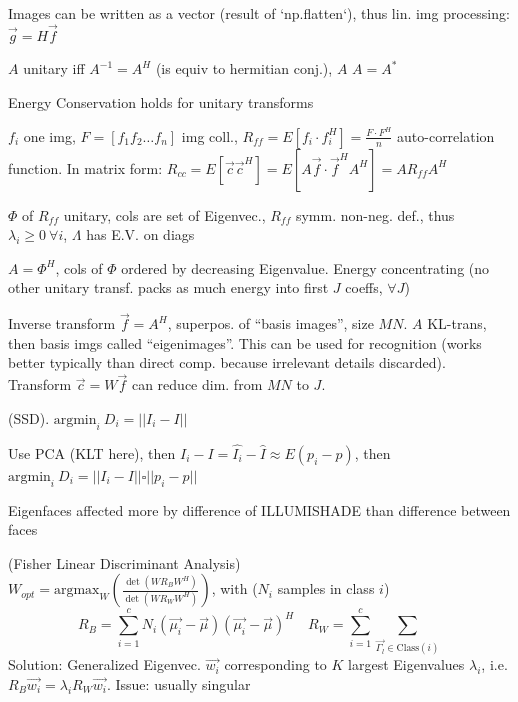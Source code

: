 Images can be written as a vector (result of `np.flatten`), thus lin. img processing: $\vec{g} = H \vec{f}$

 $A$ unitary iff $A^{-1} = A^{H}$ (is equiv to hermitian conj.), $A$  $A = A^*$

\shorttheorem Energy Conservation holds for unitary transforms

 $f_i$ one img, $F = [f_1 f_2 \dots f_n]$ img coll., $R_{ff} = E[f_i \cdot f_i^H] = \frac{F \cdot F^H}{n}$ auto-correlation function.
In matrix form: $R_{cc} = E[\vec{c} \vec{c}^H] = E[A\vec{f} \cdot \vec{f}^H A^H] = AR_{ff} A^H$

\shortdefinition[Eigenmatrix] $\Phi$ of $R_{ff}$ unitary, cols are set of Eigenvec., $R_{ff}$ symm. non-neg. def., thus $\lambda_i \geq 0 \ \forall i$,
$\Lambda$ has E.V. on diags

 $A = \Phi^H$, cols of $\Phi$ ordered by decreasing Eigenvalue.
Energy concentrating (no other unitary transf. packs as much energy into first $J$ coeffs, $\forall J$)

\shortremark Inverse transform $\vec{f} = A^H$, superpos. of ``basis images'', size $MN$. $A$ KL-trans, then basis imgs called ``eigenimages''.
This can be used for recognition (works better typically than direct comp. because irrelevant details discarded). Transform $\vec{c} = W \vec{f}$ can reduce dim. from $MN$ to $J$.

 (SSD). $\text{argmin}_i \ D_i = ||I_i - I||$

\shortremark Use PCA (KLT here), then $I_i - I = \hat{I_i} - \hat{I} \approx E(p_i - p)$, then $\text{argmin}_i \ D_i = ||I_i - I|| \square ||p_i - p||$

\shortremark Eigenfaces affected more by difference of \small{ILLUMISHADE} than difference between faces

\shortdefinition[FLD] (Fisher Linear Discriminant Analysis)\\
$W_{opt} = \text{argmax}_W \left( \frac{\det(W R_B W^H)}{\det(W R_W W^H)} \right)$, with ($N_i$ samples in class $i$)
\[
    R_B = \sum_{i = 1}^{c} N_i(\vec{\mu_i} - \vec{\mu})(\vec{\mu_i} - \vec{\mu})^H
    \quad
    \displaystyle R_W = \sum_{i = 1}^{c} \sum_{\vec{\Gamma_l} \in \text{Class}(i)}
\]
Solution: Generalized Eigenvec. $\vec{w_i}$ corresponding to $K$ largest Eigenvalues $\lambda_i$, i.e.
$R_B \vec{w_i} = \lambda_i R_W \vec{w_i}$. Issue: usually singular

